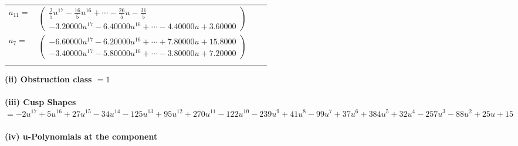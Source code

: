 \documentclass[1p]{elsarticle_modified}
\theoremstyle{definition}
\begin{document}
\begin{tabular}{m{7pt} m{180pt} m{7pt} m{180pt} }
\flushright $a_{11}=$&$\begin{pmatrix}\frac{2}{5} u^{17}-\frac{16}{5} u^{16}+\cdots-\frac{26}{5} u-\frac{31}{5}\\-3.20000 u^{17}-6.40000 u^{16}+\cdots-4.40000 u+3.60000\end{pmatrix}$ \\
\flushright $a_{7}=$&$\begin{pmatrix}-6.60000 u^{17}-6.20000 u^{16}+\cdots+7.80000 u+15.8000\\-3.40000 u^{17}-5.80000 u^{16}+\cdots-3.80000 u+7.20000\end{pmatrix}$\\&\end{tabular}
\flushleft \textbf{(ii) Obstruction class $= 1$}\\~\\
\flushleft \textbf{(iii) Cusp Shapes $= -2 u^{17}+5 u^{16}+27 u^{15}-34 u^{14}-125 u^{13}+95 u^{12}+270 u^{11}-122 u^{10}-239 u^9+41 u^8-99 u^7+37 u^6+384 u^5+32 u^4-257 u^3-88 u^2+25 u+15$}\\~\\
\newpage\renewcommand{\arraystretch}{1}
\flushleft \textbf{(iv) u-Polynomials at the component}\newline \\
\end{document}
